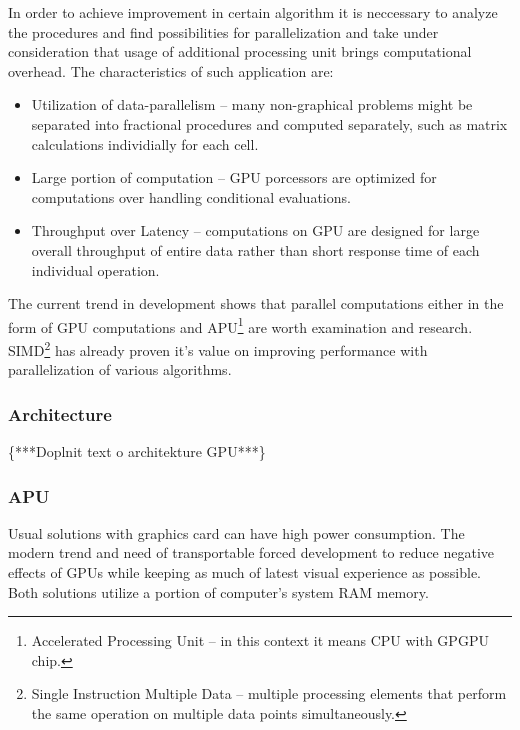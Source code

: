 In order to achieve improvement in certain algorithm it is neccessary to analyze
the procedures and find possibilities for parallelization and take under 
consideration that usage of additional processing unit brings computational 
overhead. The characteristics of such application are\cite{Owens:2008:GC}:

\begin{itemize}
\item Utilization of data-parallelism -- many non-graphical problems might be
separated into fractional procedures and computed separately, such as matrix 
calculations individially for each cell.
\item Large portion of computation -- GPU porcessors are optimized for 
computations over handling conditional evaluations.
\item Throughput over Latency -- computations on GPU are designed for large
overall throughput of entire data rather than short response time of each 
individual operation.
\end{itemize}

The current trend in development shows that parallel computations either in the
form of GPU computations and APU\footnote{ Accelerated Processing Unit -- 
in this context it means CPU with GPGPU chip.} are
worth examination and research. SIMD\footnote{ Single Instruction Multiple Data 
-- multiple processing elements that perform the same operation on multiple data 
points simultaneously\cite{Flynn:1972}.} has already proven it's value on 
improving performance with parallelization of various 
algorithms\cite{nvidia:sample, amd:apps}.

\subsubsection*{Architecture}

\{***Doplnit text o architekture GPU***\}





\subsubsection*{APU}
Usual solutions with graphics card can have high power consumption. The modern
trend and need of transportable forced development to reduce negative 
effects of GPUs while keeping as much of latest visual experience as 
possible\cite{apu:efficiency}.
Both solutions utilize a portion of computer's system RAM memory.


